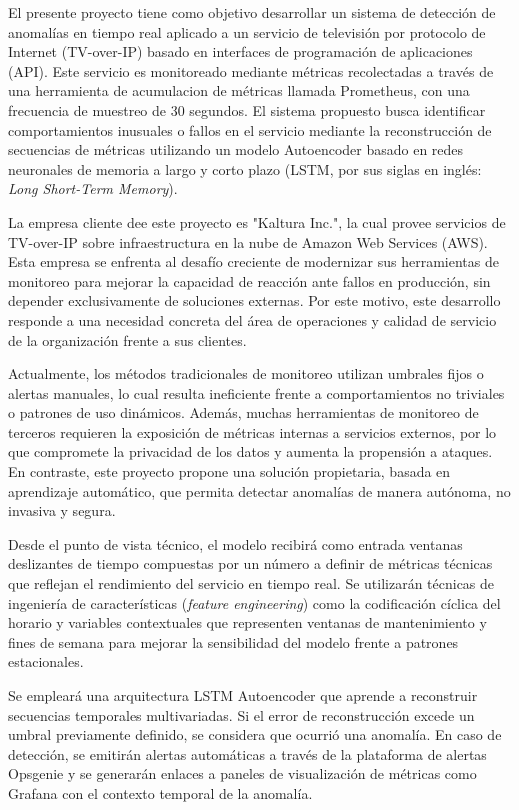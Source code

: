 \documentclass[
11pt, %
]{charter}
\begin{document}
El presente proyecto tiene como objetivo desarrollar un sistema de detección de anomalías en tiempo real aplicado a un servicio de televisión por protocolo de Internet (TV-over-IP) basado en interfaces de programación de aplicaciones (API). Este servicio es monitoreado mediante métricas recolectadas a través de una herramienta de acumulacion de métricas llamada Prometheus, con una frecuencia de muestreo de 30 segundos. El sistema propuesto busca identificar comportamientos inusuales o fallos en el servicio mediante la reconstrucción de secuencias de métricas utilizando un modelo Autoencoder basado en redes neuronales de memoria a largo y corto plazo (LSTM, por sus siglas en inglés: \textit{Long Short-Term Memory}).

La empresa cliente dee este proyecto es "Kaltura Inc.", la cual provee servicios de TV-over-IP sobre infraestructura en la nube de Amazon Web Services (AWS). Esta empresa se enfrenta al desafío creciente de modernizar sus herramientas de monitoreo para mejorar la capacidad de reacción ante fallos en producción, sin depender exclusivamente de soluciones externas. Por este motivo, este desarrollo responde a una necesidad concreta del área de operaciones y calidad de servicio de la organización frente a sus clientes.

Actualmente, los métodos tradicionales de monitoreo utilizan umbrales fijos o alertas manuales, lo cual resulta ineficiente frente a comportamientos no triviales o patrones de uso dinámicos. Además, muchas herramientas de monitoreo de terceros requieren la exposición de métricas internas a servicios externos, por lo que compromete  la privacidad de los datos y aumenta la propensión a ataques. En contraste, este proyecto propone una solución propietaria, basada en aprendizaje automático, que permita detectar anomalías de manera autónoma, no invasiva y segura.

Desde el punto de vista técnico, el modelo recibirá como entrada ventanas deslizantes de tiempo compuestas por un número a definir de métricas técnicas que reflejan el rendimiento del servicio en tiempo real. Se utilizarán técnicas de ingeniería de características (\textit{feature engineering}) como la codificación cíclica del horario y variables contextuales que representen ventanas de mantenimiento y fines de semana para mejorar la sensibilidad del modelo frente a patrones estacionales.

Se empleará una arquitectura LSTM Autoencoder que aprende a reconstruir secuencias temporales multivariadas. Si el error de reconstrucción excede un umbral previamente definido, se considera que ocurrió una anomalía. En caso de detección, se emitirán alertas automáticas a través de la plataforma de alertas Opsgenie y se generarán enlaces a paneles de visualización de métricas como Grafana con el contexto temporal de la anomalía.
\end{document}
